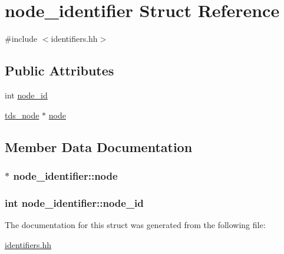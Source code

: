 \hypertarget{structnode__identifier}{\section{node\-\_\-identifier Struct Reference}
\label{structnode__identifier}
}


{\ttfamily \#include $<$identifiers.\-hh$>$}

\subsection*{Public Attributes}
\begin{DoxyCompactItemize}
\item 
int \hyperlink{structnode__identifier_aeb6689eabdda3bc30e7c385940fbdf23}{node\-\_\-id}
\item 
\hyperlink{classtds__node}{tds\-\_\-node} $\ast$ \hyperlink{structnode__identifier_ac7c3a08e75cfd2cec2decd099c1577b3}{node}
\end{DoxyCompactItemize}


\subsection{Member Data Documentation}
\hypertarget{structnode__identifier_ac7c3a08e75cfd2cec2decd099c1577b3}{
\subsubsection[{node}]{$\ast$ node\-\_\-identifier\-::node}}\label{structnode__identifier_ac7c3a08e75cfd2cec2decd099c1577b3}
\hypertarget{structnode__identifier_aeb6689eabdda3bc30e7c385940fbdf23}{
\subsubsection[{node\-\_\-id}]{\setlength{\rightskip}{0pt plus 5cm}int node\-\_\-identifier\-::node\-\_\-id}}\label{structnode__identifier_aeb6689eabdda3bc30e7c385940fbdf23}


The documentation for this struct was generated from the following file\-:\begin{DoxyCompactItemize}
\item 
\hyperlink{identifiers_8hh}{identifiers.\-hh}\end{DoxyCompactItemize}
